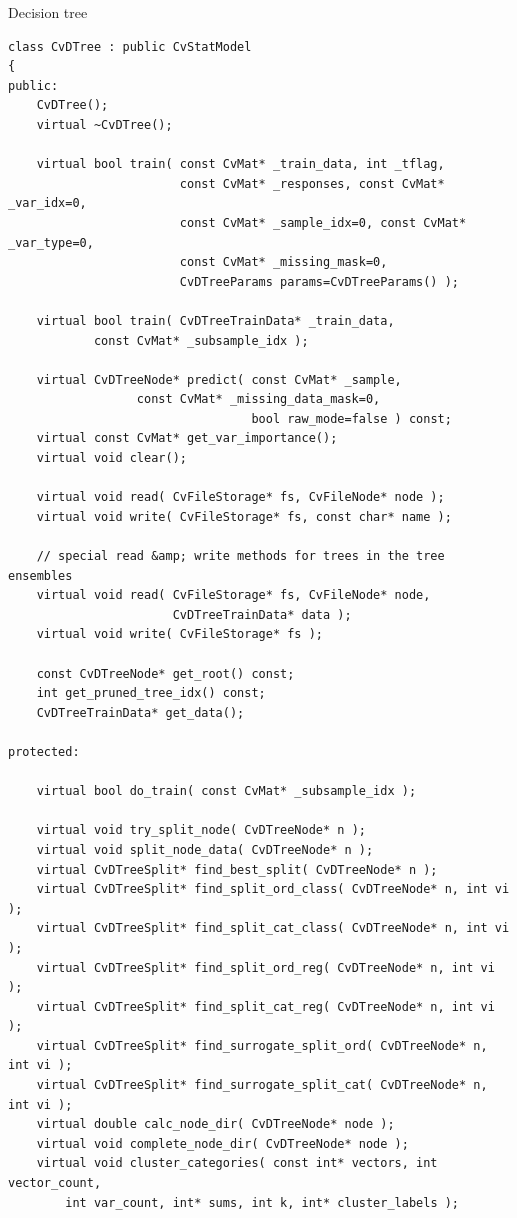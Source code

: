 
Decision tree

\begin{lstlisting}
class CvDTree : public CvStatModel
{
public:
    CvDTree();
    virtual ~CvDTree();

    virtual bool train( const CvMat* _train_data, int _tflag,
                        const CvMat* _responses, const CvMat* _var_idx=0,
                        const CvMat* _sample_idx=0, const CvMat* _var_type=0,
                        const CvMat* _missing_mask=0,
                        CvDTreeParams params=CvDTreeParams() );

    virtual bool train( CvDTreeTrainData* _train_data, 
			const CvMat* _subsample_idx );

    virtual CvDTreeNode* predict( const CvMat* _sample, 
				  const CvMat* _missing_data_mask=0,
                                  bool raw_mode=false ) const;
    virtual const CvMat* get_var_importance();
    virtual void clear();

    virtual void read( CvFileStorage* fs, CvFileNode* node );
    virtual void write( CvFileStorage* fs, const char* name );

    // special read &amp; write methods for trees in the tree ensembles
    virtual void read( CvFileStorage* fs, CvFileNode* node,
                       CvDTreeTrainData* data );
    virtual void write( CvFileStorage* fs );

    const CvDTreeNode* get_root() const;
    int get_pruned_tree_idx() const;
    CvDTreeTrainData* get_data();

protected:

    virtual bool do_train( const CvMat* _subsample_idx );

    virtual void try_split_node( CvDTreeNode* n );
    virtual void split_node_data( CvDTreeNode* n );
    virtual CvDTreeSplit* find_best_split( CvDTreeNode* n );
    virtual CvDTreeSplit* find_split_ord_class( CvDTreeNode* n, int vi );
    virtual CvDTreeSplit* find_split_cat_class( CvDTreeNode* n, int vi );
    virtual CvDTreeSplit* find_split_ord_reg( CvDTreeNode* n, int vi );
    virtual CvDTreeSplit* find_split_cat_reg( CvDTreeNode* n, int vi );
    virtual CvDTreeSplit* find_surrogate_split_ord( CvDTreeNode* n, int vi );
    virtual CvDTreeSplit* find_surrogate_split_cat( CvDTreeNode* n, int vi );
    virtual double calc_node_dir( CvDTreeNode* node );
    virtual void complete_node_dir( CvDTreeNode* node );
    virtual void cluster_categories( const int* vectors, int vector_count,
        int var_count, int* sums, int k, int* cluster_labels );


\end{lstlisting}
